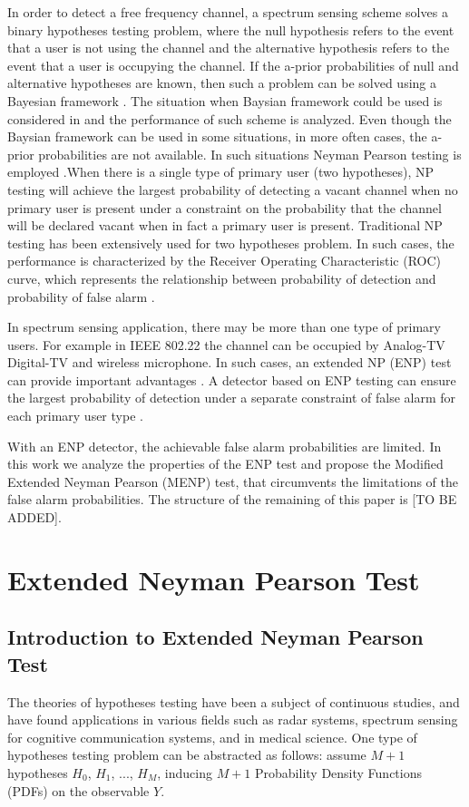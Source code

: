 \documentclass[12pt,journal,a4paper,twoside,doublecolumn]{IEEEtran}
\begin{document}
\begin{spacing}{1.0}
In order to detect a free frequency channel, a spectrum sensing scheme solves a binary hypotheses testing problem, where the null hypothesis refers to the event that a user is not using the channel and the alternative hypothesis refers to the event that a user is occupying the channel. If the a-prior probabilities of null and alternative hypotheses are known, then such a problem can be solved using a Bayesian framework \cite{poor1994introduction}. The situation when Baysian framework could be used is considered in \cite{zeng2010review} and the performance of such scheme is analyzed.
Even though the Baysian framework can be used in some situations, in more often cases, the a-prior probabilities are not available. In such situations Neyman Pearson testing is employed \cite{poor1994introduction}.When there is a single type of primary user (two hypotheses), NP testing will achieve the largest probability of detecting a vacant channel when no primary user is present under a constraint on the probability that the channel will be declared vacant when in fact a primary user is present.
Traditional NP testing has been extensively used for two hypotheses problem. In such cases,  the performance is characterized by the Receiver Operating Characteristic (ROC) curve, which represents the relationship between probability of detection and probability of false alarm \cite{poor1994introduction}.

In spectrum sensing application, there may be more than one type of primary users. For example in IEEE 802.22 \cite{shellhammer2008spectrum} the channel can be occupied by Analog-TV Digital-TV and wireless microphone. In such cases, an extended NP (ENP) test can provide important advantages \cite{zhang1999design}. A detector based on ENP testing can ensure the largest probability of detection under a separate constraint of false alarm for each primary user type \cite{LehmannTest}.

With an ENP detector, the achievable false alarm probabilities are limited. In this work we analyze the properties of the ENP test and propose the Modified Extended Neyman Pearson (MENP) test, that circumvents the limitations of the false alarm probabilities. The structure of the remaining of this paper is [TO BE ADDED].

\section{Extended Neyman Pearson Test}

\subsection{Introduction to Extended Neyman Pearson Test}
The theories of hypotheses testing have been a subject of continuous studies, and have found applications in various fields such as radar systems, spectrum sensing for cognitive communication systems, and in  medical science. One type of hypotheses testing problem can be abstracted as  follows: assume $M+1$  hypotheses $H_0$, $H_1$, ..., $H_{M}$, inducing $M+1$  Probability Density Functions (PDFs) on the observable $Y$.


\end{spacing}
\end{document}
